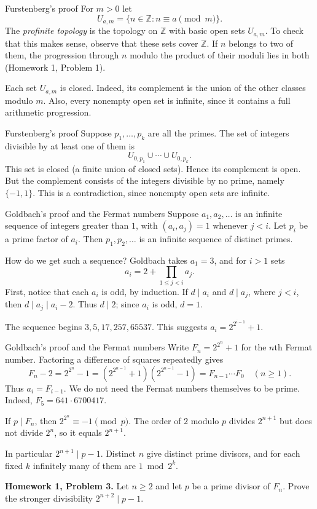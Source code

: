 \documentclass[aspectratio=169,11pt]{beamer}
\newcommand{\Z}{\mathbb Z}
\newcommand{\HW}[2]{{\color{teal}\textbf{Homework #1, Problem #2.}}}
\begin{document}
\begin{frame}{Furstenberg's proof}
For $m>0$ let
\[U_{a,m}=\{n\in\Z:n\equiv a\pmod m\}.\]
The \emph{profinite topology} is the topology on $\Z$ with basic open sets $U_{a,m}$. To check that this makes sense, observe that these sets cover $\Z$. If $n$ belongs to two of them, the progression through $n$ modulo the product of their moduli lies in both (Homework 1, Problem 1).

Each set $U_{a,m}$ is closed. Indeed, its complement is the union of the other classes modulo $m$. Also, every nonempty open set is infinite, since it contains a full arithmetic progression.
\end{frame}
\begin{frame}{Furstenberg's proof}
Suppose $p_1,\ldots,p_k$ are all the primes. The set of integers divisible by at least one of them is
\[U_{0,p_1}\cup\cdots\cup U_{0,p_k}.\]
This set is closed (a finite union of closed sets). Hence its complement is open. But the complement consists of the integers divisible by no prime, namely $\{-1,1\}$. This is a contradiction, since nonempty open sets are infinite.
\end{frame}
\begin{frame}{Goldbach's proof and the Fermat numbers}
Suppose $a_1,a_2,\ldots$ is an infinite sequence of integers greater than $1$, with $(a_i,a_j)=1$ whenever $j<i$. Let $p_i$ be a prime factor of $a_i$. Then $p_1,p_2,\ldots$ is an infinite sequence of distinct primes.

How do we get such a sequence? Goldbach takes $a_1=3$, and for $i>1$ sets
\[a_i=2+\prod_{1\le j<i}a_j.\]
First, notice that each $a_i$ is odd, by induction. If $d\mid a_i$ and $d\mid a_j$, where $j<i$, then $d\mid a_j\mid a_i-2$. Thus $d\mid2$; since $a_i$ is odd, $d=1$.

The sequence begins $3,5,17,257,65537$. This suggests $a_i=2^{2^{i-1}}+1$.
\end{frame}
\begin{frame}{Goldbach's proof and the Fermat numbers}
\small
Write $F_n=2^{2^n}+1$ for the $n$th Fermat number. Factoring a difference of squares repeatedly gives
\[F_n-2=2^{2^n}-1=(2^{2^{n-1}}+1)(2^{2^{n-1}}-1)=F_{n-1}\cdots F_0\quad(n\ge1).\]
Thus $a_i=F_{i-1}$. We do not need the Fermat numbers themselves to be prime. Indeed, $F_5=641\cdot6700417$.

If $p\mid F_n$, then $2^{2^n}\equiv-1\pmod p$. The order of $2$ modulo $p$ divides $2^{n+1}$ but does not divide $2^n$, so it equals $2^{n+1}$.

In particular $2^{n+1}\mid p-1$. Distinct $n$ give distinct prime divisors, and for each fixed $k$ infinitely many of them are $1\bmod 2^k$.

\HW{1}{3} Let $n\ge2$ and let $p$ be a prime divisor of $F_n$. Prove the stronger divisibility $2^{n+2}\mid p-1$.
\end{frame}
\end{document}
